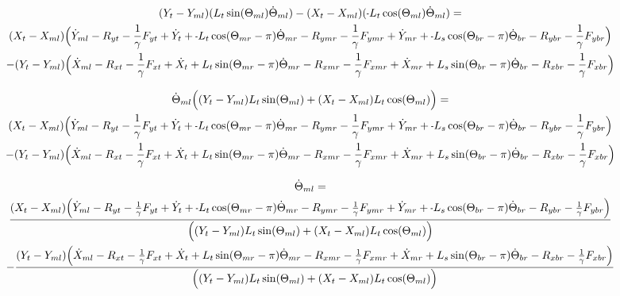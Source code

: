 \documentclass[11pt, landscape]{article}
\newcommand{\mn}{\scalebox{0.7}[1.0]{-}}
\begin{document}
\begin{multline}
(Y_{t } - Y_{ml})(L_{t}\sin(\Theta_{ml}) \dot{\Theta}_{ml}) - (X_{t } - X_{ml})(\mn L_{t}\cos(\Theta_{ml}) \dot{\Theta}_{ml}) = \\
(X_{t } - X_{ml}) \Big( \dot{Y}_{ml} - R_{yt} - \frac{1}{\gamma}F_{yt } + \dot{Y}_{t } + \mn L_{t}\cos(\Theta_{mr}-\pi)  \dot{\Theta}_{mr}
- R_{ymr} - \frac{1}{\gamma}F_{ymr} + \dot{Y}_{mr} + \mn L_{s}\cos(\Theta_{br}-\pi)  \dot{\Theta}_{br} - R_{ybr} - \frac{1}{\gamma}F_{ybr}\Big) \\
- (Y_{t } - Y_{ml})\Big( \dot{X}_{ml} - R_{xt } - \frac{1}{\gamma}F_{xt } + \dot{X}_{t } + L_{t}\sin(\Theta_{mr}-\pi)  \dot{\Theta}_{mr}
- R_{xmr} - \frac{1}{\gamma}F_{xmr} + \dot{X}_{mr} + L_{s}\sin(\Theta_{br}-\pi)  \dot{\Theta}_{br} - R_{xbr} - \frac{1}{\gamma}F_{xbr} \Big)
\end{multline}

\begin{multline}
\dot{\Theta}_{ml} \Big((Y_{t } - Y_{ml})L_{t}\sin(\Theta_{ml}) + (X_{t } - X_{ml})L_{t}\cos(\Theta_{ml}) \Big) = \\
(X_{t } - X_{ml}) \Big( \dot{Y}_{ml} - R_{yt} - \frac{1}{\gamma}F_{yt } + \dot{Y}_{t } + \mn L_{t}\cos(\Theta_{mr}-\pi)  \dot{\Theta}_{mr}
- R_{ymr} - \frac{1}{\gamma}F_{ymr} + \dot{Y}_{mr} + \mn L_{s}\cos(\Theta_{br}-\pi)  \dot{\Theta}_{br} - R_{ybr} - \frac{1}{\gamma}F_{ybr}\Big) \\
- (Y_{t } - Y_{ml})\Big( \dot{X}_{ml} - R_{xt } - \frac{1}{\gamma}F_{xt } + \dot{X}_{t } + L_{t}\sin(\Theta_{mr}-\pi)  \dot{\Theta}_{mr}
- R_{xmr} - \frac{1}{\gamma}F_{xmr} + \dot{X}_{mr} + L_{s}\sin(\Theta_{br}-\pi)  \dot{\Theta}_{br} - R_{xbr} - \frac{1}{\gamma}F_{xbr} \Big)
\end{multline}

\begin{multline}
\dot{\Theta}_{ml} = \\
\frac{(X_{t } - X_{ml}) \Big( \dot{Y}_{ml} - R_{yt} - \frac{1}{\gamma}F_{yt } + \dot{Y}_{t } + \mn L_{t}\cos(\Theta_{mr}-\pi)  \dot{\Theta}_{mr}
- R_{ymr} - \frac{1}{\gamma}F_{ymr} + \dot{Y}_{mr} + \mn L_{s}\cos(\Theta_{br}-\pi)  \dot{\Theta}_{br} - R_{ybr} - \frac{1}{\gamma}F_{ybr}\Big)}
{\Big((Y_{t } - Y_{ml})L_{t}\sin(\Theta_{ml}) + (X_{t } - X_{ml})L_{t}\cos(\Theta_{ml}) \Big)} \\
- \frac{(Y_{t } - Y_{ml})\Big( \dot{X}_{ml} - R_{xt } - \frac{1}{\gamma}F_{xt } + \dot{X}_{t } + L_{t}\sin(\Theta_{mr}-\pi)  \dot{\Theta}_{mr}
- R_{xmr} - \frac{1}{\gamma}F_{xmr} + \dot{X}_{mr} + L_{s}\sin(\Theta_{br}-\pi)  \dot{\Theta}_{br} - R_{xbr} - \frac{1}{\gamma}F_{xbr} \Big)}
{\Big((Y_{t } - Y_{ml})L_{t}\sin(\Theta_{ml}) + (X_{t } - X_{ml})L_{t}\cos(\Theta_{ml}) \Big)}
\end{multline}
\end{document}
